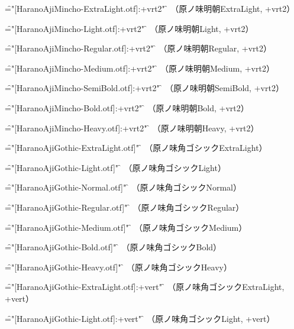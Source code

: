 \font\f="[HaranoAjiMincho-ExtraLight.otf]:+vrt2" \f
\testAll
（原ノ味明朝ExtraLight, +vrt2）\par

\font\f="[HaranoAjiMincho-Light.otf]:+vrt2" \f
\testAll
（原ノ味明朝Light, +vrt2）\par

\font\f="[HaranoAjiMincho-Regular.otf]:+vrt2" \f
\testAll
（原ノ味明朝Regular, +vrt2）\par

\font\f="[HaranoAjiMincho-Medium.otf]:+vrt2" \f
\testAll
（原ノ味明朝Medium, +vrt2）\par

\font\f="[HaranoAjiMincho-SemiBold.otf]:+vrt2" \f
\testAll
（原ノ味明朝SemiBold, +vrt2）\par

\font\f="[HaranoAjiMincho-Bold.otf]:+vrt2" \f
\testAll
（原ノ味明朝Bold, +vrt2）\par

\font\f="[HaranoAjiMincho-Heavy.otf]:+vrt2" \f
\testAll
（原ノ味明朝Heavy, +vrt2）\par



\font\f="[HaranoAjiGothic-ExtraLight.otf]" \f
\testAll
（原ノ味角ゴシックExtraLight）\par

\font\f="[HaranoAjiGothic-Light.otf]" \f
\testAll
（原ノ味角ゴシックLight）\par

\font\f="[HaranoAjiGothic-Normal.otf]" \f
\testAll
（原ノ味角ゴシックNormal）\par

\font\f="[HaranoAjiGothic-Regular.otf]" \f
\testAll
（原ノ味角ゴシックRegular）\par

\font\f="[HaranoAjiGothic-Medium.otf]" \f
\testAll
（原ノ味角ゴシックMedium）\par

\font\f="[HaranoAjiGothic-Bold.otf]" \f
\testAll
（原ノ味角ゴシックBold）\par

\font\f="[HaranoAjiGothic-Heavy.otf]" \f
\testAll
（原ノ味角ゴシックHeavy）\par


\font\f="[HaranoAjiGothic-ExtraLight.otf]:+vert" \f
\testAll
（原ノ味角ゴシックExtraLight, +vert）\par

\font\f="[HaranoAjiGothic-Light.otf]:+vert" \f
\testAll
（原ノ味角ゴシックLight, +vert）\par


